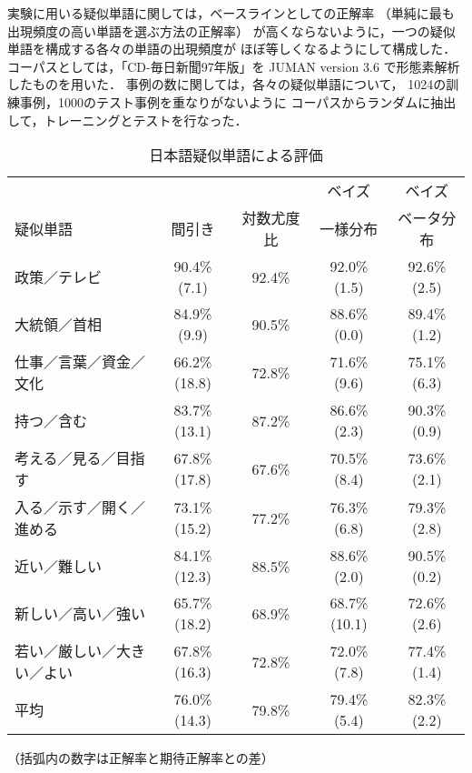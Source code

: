 実験に用いる疑似単語に関しては，ベースラインとしての正解率
（単純に最も出現頻度の高い単語を選ぶ方法の正解率）
が高くならないように，一つの疑似単語を構成する各々の単語の出現頻度が
ほぼ等しくなるようにして構成した．
コーパスとしては，「CD-毎日新聞97年版」を
JUMAN version 3.6 \cite{juman}で形態素解析したものを用いた．
事例の数に関しては，各々の疑似単語について，
1024の訓練事例，1000のテスト事例を重なりがないように
コーパスからランダムに抽出して，トレーニングとテストを行なった．

\begin{table*}
  \caption{日本語疑似単語による評価}
  
  \label{tab:comp}
\begin{center}
\begin{tabular}{l|c|c|c|c} \hline
               	&	&		&ベイズ 	&ベイズ\\
疑似単語 	&間引き	&対数尤度比	&一様分布	&ベータ分布\\
\hline
政策／テレビ		&90.4\%	(7.1)&92.4\%	&92.0\% (1.5)&92.6\% (2.5)	\\
大統領／首相		&84.9\%	(9.9)&90.5\%	&88.6\% (0.0)&89.4\% (1.2)	\\
仕事／言葉／資金／文化	&66.2\%	(18.8)&72.8\%	&71.6\% (9.6)&75.1\% (6.3)	\\
持つ／含む		&83.7\%	(13.1)&87.2\%	&86.6\% (2.3)&90.3\% (0.9)	\\
考える／見る／目指す	&67.8\%	(17.8)&67.6\%	&70.5\% (8.4)&73.6\% (2.1)	\\
入る／示す／開く／進める&73.1\%	(15.2)&77.2\%	&76.3\% (6.8)&79.3\% (2.8)	\\
近い／難しい		&84.1\%	(12.3)&88.5\%	&88.6\% (2.0)&90.5\% (0.2)	\\
新しい／高い／強い	&65.7\%	(18.2)&68.9\%	&68.7\% (10.1)&72.6\% (2.6)	\\
若い／厳しい／大きい／よい &67.8\%	(16.3)&72.8\%	&72.0\% (7.8) &77.4\% (1.4)	\\
\hline
平均			&76.0\%	(14.3)&79.8\%	&79.4\% (5.4)&82.3\% (2.2)	\\
\hline
\end{tabular}
\end{center}

\vspace{0.5mm}
\begin{flushright}
（括弧内の数字は正解率と期待正解率との差）
\end{flushright}

\end{table*}

